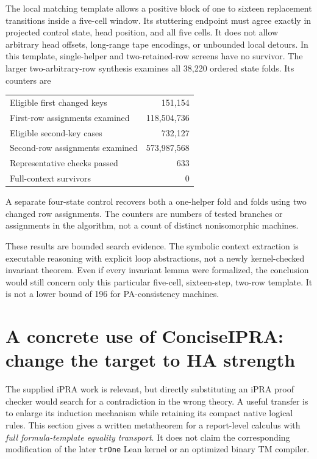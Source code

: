 \documentclass[11pt,letterpaper]{article}
\newcommand{\file}[1]{\texttt{\nolinkurl{#1}}}
\begin{document}
The local matching template allows a positive block of one to sixteen
replacement transitions inside a five-cell window. Its stuttering endpoint
must agree exactly in projected control state, head position, and all five
cells. It
does not allow arbitrary head offsets, long-range tape encodings, or
unbounded local detours. In this template, single-helper and
two-retained-row screens have no survivor. The larger two-arbitrary-row
synthesis examines all 38,220 ordered state folds. Its counters are
\begin{center}\small
\begin{tabular}{@{}lr@{}}
\toprule
Eligible first changed keys&151,154\\
First-row assignments examined&118,504,736\\
Eligible second-key cases&732,127\\
Second-row assignments examined&573,987,568\\
Representative checks passed&633\\
Full-context survivors&0\\
\bottomrule
\end{tabular}
\end{center}
A separate four-state control recovers both a one-helper fold and folds
using two changed row assignments. The counters are numbers of tested
branches or assignments in the algorithm, not a count of distinct
nonisomorphic machines.

These results are bounded search evidence. The symbolic context extraction
is executable reasoning with explicit loop abstractions, not a newly
kernel-checked invariant theorem. Even if every invariant lemma were
formalized, the conclusion would still concern only this particular
five-cell, sixteen-step, two-row template. It is not a lower bound of 196
for PA-consistency machines.

\section{A concrete use of ConciseIPRA: change the target to HA strength}

The supplied iPRA work is relevant, but directly substituting an iPRA proof
checker would search for a contradiction in the wrong theory. A useful
transfer is to enlarge its induction mechanism while retaining its compact
native logical rules. This section gives a written metatheorem for a
report-level calculus with \emph{full formula-template equality transport}.
It does not claim the corresponding modification of the later
\file{trOne} Lean kernel or an optimized binary TM compiler.
\end{document}
